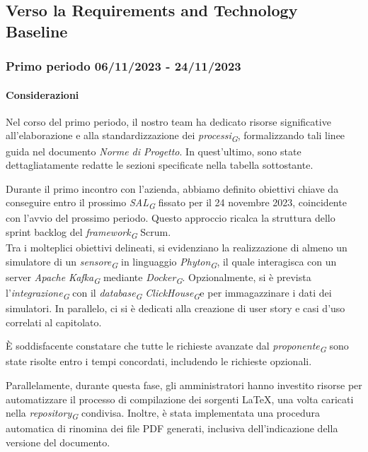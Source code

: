 \subsection{Verso la Requirements and Technology Baseline}
\subsubsection{Primo periodo  06/11/2023 - 24/11/2023}
\paragraph{Considerazioni}
    Nel corso del primo periodo, il nostro team ha dedicato risorse significative all'elaborazione e alla standardizzazione dei \textit{processi}\textsubscript{\textit{G}}, formalizzando tali linee guida nel documento \textit{Norme di Progetto}. In quest'ultimo, sono state dettagliatamente redatte le sezioni specificate nella tabella sottostante.

    \vspace{0.2cm}

    Durante il primo incontro con l'azienda, abbiamo definito obiettivi chiave da conseguire entro il prossimo \textit{SAL}\textsubscript{\textit{G}} fissato per il 24 novembre 2023, coincidente con l'avvio del prossimo periodo. Questo approccio ricalca la struttura dello sprint backlog del \textit{framework}\textsubscript{\textit{G}} Scrum. \\
    Tra i molteplici obiettivi delineati, si evidenziano la realizzazione di almeno un simulatore di un \textit{sensore}\textsubscript{\textit{G}} in linguaggio \textit{Phyton}\textsubscript{\textit{G}}, il quale interagisca con un server \textit{Apache Kafka}\textsubscript{\textit{G}} mediante \textit{Docker}\textsubscript{\textit{G}}. Opzionalmente, si è prevista l'\textit{integrazione}\textsubscript{\textit{G}} con il \textit{database}\textsubscript{\textit{G}} \textit{ClickHouse}\textsubscript{\textit{G}}e per immagazzinare i dati dei simulatori. In parallelo, ci si è dedicati alla creazione di user story e casi d'uso correlati al capitolato.

    \vspace{0.2cm}

    È soddisfacente constatare che tutte le richieste avanzate dal \textit{proponente}\textsubscript{\textit{G}} sono state risolte entro i tempi concordati, includendo le richieste opzionali.

    Parallelamente, durante questa fase, gli amministratori hanno investito risorse per automatizzare il processo di compilazione dei sorgenti \LaTeX, una volta caricati nella \textit{repository}\textsubscript{\textit{G}} condivisa. Inoltre, è stata implementata una procedura automatica di rinomina dei file PDF generati, inclusiva dell'indicazione della versione del documento.

